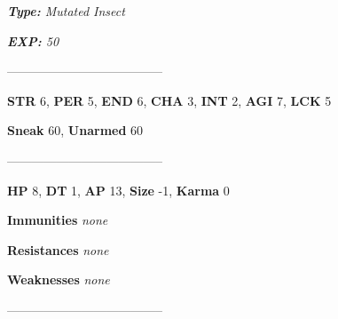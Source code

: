\documentclass[11pt,a4paper,twocolumn]{book}
\begin{document}
	\noindent
	\emph{\textbf{Type:} Mutated Insect}
	
	\noindent
	\emph{\textbf{EXP:} 50}
	
%		
%	
%		

	--------------------------------------
	
	\noindent
	\textbf{STR} 6, \textbf{PER} 5, \textbf{END} 6, \textbf{CHA} 3, \textbf{INT} 2, \textbf{AGI} 7, \textbf{LCK} 5
	
	\noindent
	\textbf{Sneak} 60, \textbf{Unarmed} 60
	
	--------------------------------------
	
	\noindent
	\textbf{HP} 8, \textbf{DT} 1, \textbf{AP} 13, \textbf{Size} -1, \textbf{Karma} 0
	
	
	\noindent
	\textbf{Immunities} \emph{none} %
	
	\noindent
	\textbf{Resistances} \emph{none} %
	
	\noindent
	\textbf{Weaknesses} \emph{none} %
	
	--------------------------------------	
	
\end{document}
